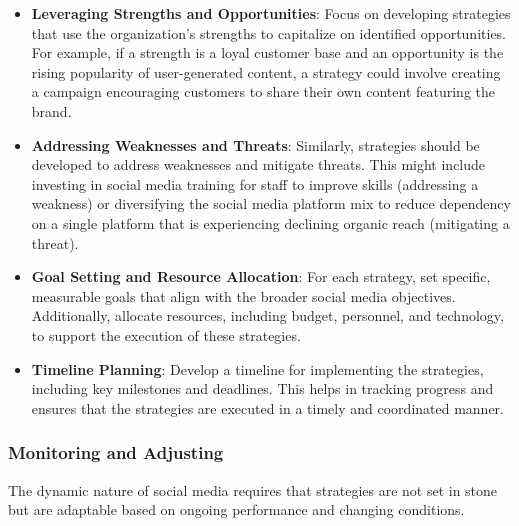 \documentclass[
]{book}
\providecommand{\tightlist}{%
  \setlength{\itemsep}{0pt}\setlength{\parskip}{0pt}}
\begin{document}
\begin{itemize}
\tightlist
\item
  \textbf{Leveraging Strengths and Opportunities}: Focus on developing strategies that use the organization's strengths to capitalize on identified opportunities. For example, if a strength is a loyal customer base and an opportunity is the rising popularity of user-generated content, a strategy could involve creating a campaign encouraging customers to share their own content featuring the brand.
\item
  \textbf{Addressing Weaknesses and Threats}: Similarly, strategies should be developed to address weaknesses and mitigate threats. This might include investing in social media training for staff to improve skills (addressing a weakness) or diversifying the social media platform mix to reduce dependency on a single platform that is experiencing declining organic reach (mitigating a threat).
\item
  \textbf{Goal Setting and Resource Allocation}: For each strategy, set specific, measurable goals that align with the broader social media objectives. Additionally, allocate resources, including budget, personnel, and technology, to support the execution of these strategies.
\item
  \textbf{Timeline Planning}: Develop a timeline for implementing the strategies, including key milestones and deadlines. This helps in tracking progress and ensures that the strategies are executed in a timely and coordinated manner.
\end{itemize}

\hypertarget{monitoring-and-adjusting}{%
\subsubsection*{Monitoring and Adjusting}\label{monitoring-and-adjusting}}

The dynamic nature of social media requires that strategies are not set in stone but are adaptable based on ongoing performance and changing conditions.
\end{document}
